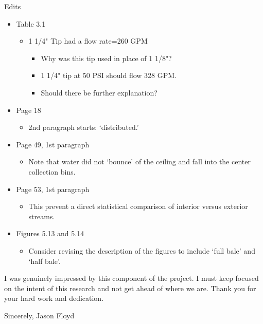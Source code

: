 \documentclass[12pt,oneside]{book}
\begin{document}
\begin{appendix}
Edits
\begin{itemize}
\item Table 3.1
	\begin{itemize}
	\item 1 1/4" Tip had a flow rate=260 GPM
		\begin{itemize}
			\item Why was this tip used in place of 1 1/8"?
			\item 1 1/4" tip at 50 PSI should flow 328 GPM.
			\item Should there be further explanation?
		\end{itemize}
	\end{itemize}
\item  Page 18
	\begin{itemize}
		\item 2nd paragraph starts: `distributed.'
	\end{itemize}
\item Page 49, 1st paragraph
	\begin{itemize}
		\item Note that water did not `bounce' of the ceiling and fall into the center collection bins.
	\end{itemize}
\item Page 53, 1st paragraph
	\begin{itemize}
		\item This prevent a direct statistical comparison of interior versus exterior streams.
	\end{itemize}
\item Figures 5.13 and 5.14
	\begin{itemize}
		\item Consider revising the description of the figures to include `full bale' and `half bale'.
	\end{itemize}
\end{itemize}
 
I was genuinely impressed by this component of the project. I must keep focused on the intent of this research and not get ahead of where we are. Thank you for your hard work and dedication.
 
Sincerely,
Jason Floyd



\end{appendix}
\end{document}
